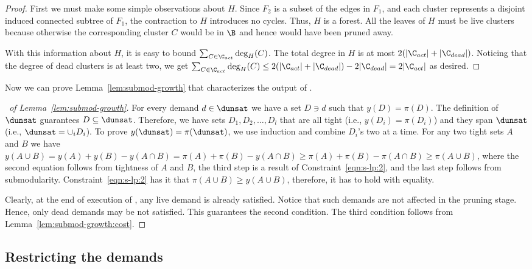 \begin{proof}
First we
  must make some simple observations about $H$.  Since $F_2$ is a subset of the edges in $F_1$, and each cluster represents a
  disjoint induced connected subtree of $F_1$, the contraction to $H$ introduces  no cycles.  Thus, $H$ is a forest.
  All the leaves of $H$ must
  be live clusters because otherwise the corresponding cluster $C$ would be
  in $\B$ and  hence would have been pruned away.


  With this information about $H$, it is easy to bound $\sum_{C \in
    \C_{act}} \deg_H(C)$.
  The total degree in $H$ is at most $2(|\C_{act}|+|\C_{dead}|)$.
  Noticing that the degree of dead clusters is at least two,
  we get $\sum_{C\in\C_{act}}\deg_H(C) \leq 2(|\C_{act}|+|\C_{dead}|) - 2|\C_{dead}| = 2|\C_{act}|$ as desired.
\end{proof}


Now we can prove Lemma~\ref{lem:submod-growth}
that characterizes the output of .

\begin{proof}[\proofname\ of Lemma~\ref{lem:submod-growth}]
For every demand $d \in \dunsat$ we have a set $D \ni d$
such that $y(D) = \pi(D)$.  The definition of $\dunsat$ guarantees
$D \subseteq \dunsat$.  Therefore, we have sets $D_1, D_2, \dots, D_l$
that are all tight (i.e., $y(D_i) = \pi(D_i)$) and they span $\dunsat$
(i.e., $\dunsat = \cup_i D_i$).
To prove $y(\dunsat) = \pi(\dunsat)$, we use induction
and combine $D_i$'s two at a time.
For any two tight sets $A$ and $B$ we have
$y(A \cup B) = y(A) + y(B) - y(A\cap B) = \pi(A) + \pi(B) - y(A\cap B)
\geq \pi(A) + \pi(B) -\pi(A\cap B) \geq \pi(A \cup B)$,
where the second equation follows from tightness of $A$ and $B$,
the third step is a result of Constraint~\eqref{eqn:s-lp:2},
and the last step follows from submodularity.
Constraint~\eqref{eqn:s-lp:2} has it that $\pi(A\cup B) \geq y(A \cup B)$,
therefore, it has to hold with equality.

Clearly, at the end of execution of ,
any live demand is already satisfied.  Notice that such demands are not
affected in the pruning stage.  Hence, only dead demands may be not satisfied.
This guarantees the second condition.  The third condition follows from
Lemma~\ref{lem:submod-growth:cost}.
\end{proof}






\subsection{Restricting the demands}\label{sec:reduce:1}\label{sec:rest-prize}

